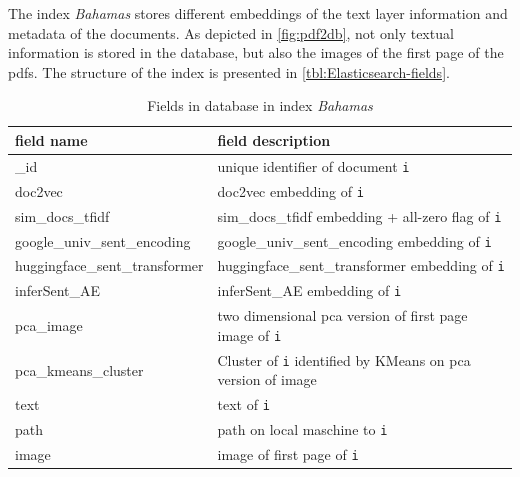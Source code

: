 The index \textit{Bahamas} stores different embeddings of the text layer information and metadata of the documents.
As depicted in \autoref{fig:pdf2db}, not only textual information is stored in the database, but also the images of the first page of the \acp{pdf}.
The structure of the index is presented in \autoref{tbl:Elasticsearch-fields}.

\begin{table}[]
    \caption{Fields in \databaseName{} database in index \textit{Bahamas}}
    \begin{tabular}{|
    >{\columncolor[HTML]{EFEFEF}}l |p{}|}
    \hline
    \cellcolor[HTML]{C0C0C0}\textbf{field name} & \cellcolor[HTML]{C0C0C0}\textbf{field description}                                       \\ \hline
    \_id                                        & unique identifier of document \texttt{i}                                                 \\ \hline
    doc2vec                                     & doc2vec embedding of \texttt{i}                                                          \\ \hline
    sim\_docs\_tfidf                            & sim\_docs\_tfidf embedding + all-zero flag of \texttt{i}                                 \\ \hline
    google\_univ\_sent\_encoding                & google\_univ\_sent\_encoding embedding of \texttt{i}                                     \\ \hline
    huggingface\_sent\_transformer              & huggingface\_sent\_transformer embedding of \texttt{i}                                   \\ \hline
    inferSent\_AE                               & inferSent\_AE embedding of \texttt{i}                                                    \\ \hline
    pca\_image                                  & two dimensional \ac{pca} version of first page image of \texttt{i}                      \\ \hline
    pca\_kmeans\_cluster                        & Cluster of \texttt{i} identified by KMeans on \ac{pca} version of image                 \\ \hline
    text                                        & text of \texttt{i}                                                                       \\ \hline
    path                                        & path on local maschine to \texttt{i}                                                     \\ \hline
    image                                       & image of first page of \texttt{i}                                                        \\ \hline
    \end{tabular}
    \label{tbl:Elasticsearch-fields}
\end{table}

